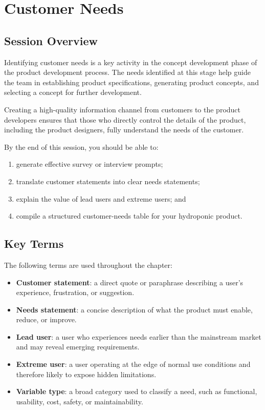 \chapter{Customer Needs}

\section{Session Overview}

Identifying customer needs is a key activity in the concept development phase of the product development process. The needs identified at this stage help guide the team in establishing product specifications, generating product concepts, and selecting a concept for further development.

Creating a high-quality information channel from customers to the product developers ensures that those who directly control the details of the product, including the product designers, fully understand the needs of the customer.



By the end of this session, you should be able to:
\begin{enumerate}
    \item generate effective survey or interview prompts;
    \item translate customer statements into clear needs statements;
    \item explain the value of lead users and extreme users; and
    \item compile a structured customer-needs table for your hydroponic product.
\end{enumerate}

\section{Key Terms}

The following terms are used throughout the chapter:
\begin{itemize}
    \item \textbf{Customer statement}: a direct quote or paraphrase describing a user's experience, frustration, or suggestion.
    \item \textbf{Needs statement}: a concise description of what the product must enable, reduce, or improve.
    \item \textbf{Lead user}: a user who experiences needs earlier than the mainstream market and may reveal emerging requirements.
    \item \textbf{Extreme user}: a user operating at the edge of normal use conditions and therefore likely to expose hidden limitations.
    \item \textbf{Variable type}: a broad category used to classify a need, such as functional, usability, cost, safety, or maintainability.
\end{itemize}

